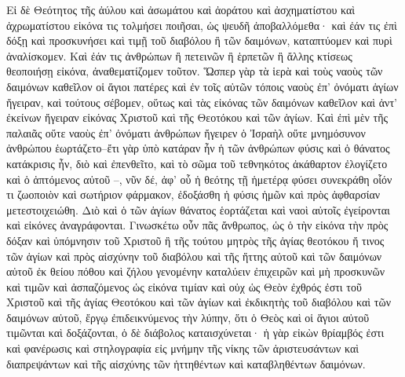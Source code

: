 \documentclass[10pt]{book}
\newcommand{\switchenglish}{\selectlanguage{english} \switchcolumn}
\begin{document}
\begin{paracol}{2}
Εἰ δὲ Θεότητος τῆς ἀύλου καὶ ἀσωμάτου καὶ ἀοράτου καὶ ἀσχηματίστου καὶ
ἀχρωματίστου εἰκόνα τις τολμήσει ποιῆσαι, ὡς ψευδῆ ἀποβαλλόμεθα· καὶ ἐάν τις
ἐπὶ δόξῃ καὶ προσκυνήσει καὶ τιμῇ τοῦ διαβόλου ἢ τῶν δαιμόνων, καταπτύομεν καὶ
πυρὶ ἀναλίσκομεν. Καὶ ἐάν τις ἀνθρώπων ἢ πετεινῶν ἢ ἑρπετῶν ἢ ἄλλης κτίσεως
θεοποιήσῃ εἰκόνα, ἀναθεματίζομεν τοῦτον. Ὥσπερ γὰρ τὰ ἱερὰ καὶ τοὺς ναοὺς τῶν
δαιμόνων καθεῖλον οἱ ἅγιοι πατέρες καὶ ἐν τοῖς αὐτῶν τόποις ναοὺς ἐπ’ ὀνόματι
ἁγίων ἤγειραν, καὶ τούτους σέβομεν, οὕτως καὶ τὰς εἰκόνας τῶν δαιμόνων
καθεῖλον καὶ ἀντ’ ἐκείνων ἤγειραν εἰκόνας Χριστοῦ καὶ τῆς Θεοτόκου καὶ τῶν
ἁγίων. Καὶ ἐπὶ μὲν τῆς παλαιᾶς οὔτε ναοὺς ἐπ’ ὀνόματι ἀνθρώπων ἤγειρεν ὁ
Ἰσραὴλ οὔτε μνημόσυνον ἀνθρώπου ἑωρτάζετο–ἔτι γὰρ ὑπὸ κατάραν ἦν ἡ τῶν
ἀνθρώπων φύσις καὶ ὁ θάνατος κατάκρισις ἦν, διὸ καὶ ἐπενθεῖτο, καὶ τὸ σῶμα τοῦ
τεθνηκότος ἀκάθαρτον ἐλογίζετο καὶ ὁ ἁπτόμενος αὐτοῦ –, νῦν δέ, ἀφ’ οὗ ἡ
θεότης τῇ ἡμετέρᾳ φύσει συνεκράθη οἷόν τι ζωοποιὸν καὶ σωτήριον φάρμακον,
ἐδοξάσθη ἡ φύσις ἡμῶν καὶ πρὸς ἀφθαρσίαν μετεστοιχειώθη. Διὸ καὶ ὁ τῶν ἁγίων
θάνατος ἑορτάζεται καὶ ναοὶ αὐτοῖς ἐγείρονται καὶ εἰκόνες ἀναγράφονται.
Γινωσκέτω οὖν πᾶς ἄνθρωπος, ὡς ὁ τὴν εἰκόνα τὴν πρὸς δόξαν καὶ ὑπόμνησιν τοῦ
Χριστοῦ ἢ τῆς τούτου μητρὸς τῆς ἁγίας θεοτόκου ἤ τινος τῶν ἁγίων καὶ πρὸς
αἰσχύνην τοῦ διαβόλου καὶ τῆς ἥττης αὐτοῦ καὶ τῶν δαιμόνων αὐτοῦ ἐκ θείου
πόθου καὶ ζήλου γενομένην καταλύειν ἐπιχειρῶν καὶ μὴ προσκυνῶν καὶ τιμῶν καὶ
ἀσπαζόμενος ὡς εἰκόνα τιμίαν καὶ οὐχ ὡς Θεὸν ἐχθρός ἐστι τοῦ Χριστοῦ καὶ τῆς
ἁγίας Θεοτόκου καὶ τῶν ἁγίων καὶ ἐκδικητὴς τοῦ διαβόλου καὶ τῶν δαιμόνων
αὐτοῦ, ἔργῳ ἐπιδεικνύμενος τὴν λύπην, ὅτι ὁ Θεὸς καὶ οἱ ἅγιοι αὐτοῦ τιμῶνται
καὶ δοξάζονται, ὁ δὲ διάβολος καταισχύνεται· ἡ γὰρ εἰκὼν θρίαμβός ἐστι καὶ
φανέρωσις καὶ στηλογραφία εἰς μνήμην τῆς νίκης τῶν ἀριστευσάντων καὶ
διαπρεψάντων καὶ τῆς αἰσχύνης τῶν ἡττηθέντων καὶ καταβληθέντων δαιμόνων.

\switchenglish


\end{paracol}
\end{document}
